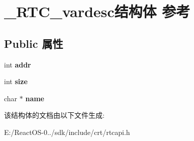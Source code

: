 \hypertarget{struct___r_t_c__vardesc}{}\section{\+\_\+\+R\+T\+C\+\_\+vardesc结构体 参考}
\label{struct___r_t_c__vardesc}
\subsection*{Public 属性}
\begin{DoxyCompactItemize}
\item 
\mbox{\label{struct___r_t_c__vardesc_ad35a97d299b2f2d9c1e11bfccb527241}} 
int {\bfseries addr}
\item 
\mbox{\label{struct___r_t_c__vardesc_ac837bd84a1ba36458d687eb987eee8b5}} 
int {\bfseries size}
\item 
\mbox{\label{struct___r_t_c__vardesc_a9539b12969ebc1590b6d9c6ff4076a2e}} 
char $\ast$ {\bfseries name}
\end{DoxyCompactItemize}


该结构体的文档由以下文件生成\+:\begin{DoxyCompactItemize}
\item 
E\+:/\+React\+O\+S-\/0../sdk/include/crt/rtcapi.\+h\end{DoxyCompactItemize}
